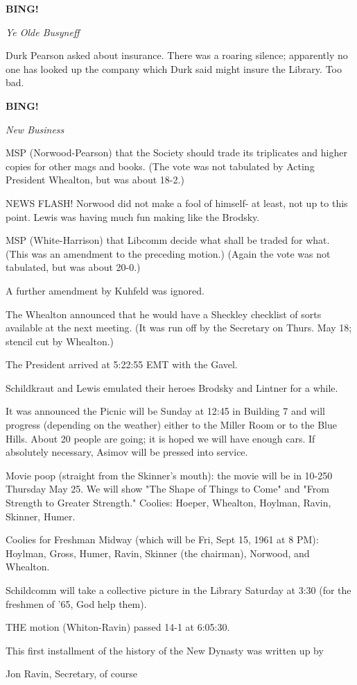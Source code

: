 \documentclass[12pt]{article}
\newcommand{\bing}{{\bf BING!} }
\newcommand{\goto}[1]{\bing \vskip 12pt \centerline{{\em{#1}}}}
\begin{document}
\goto{Ye Olde Busyneff}

Durk Pearson asked about insurance. There was a roaring silence; apparently no one has looked up the company which Durk said might insure the Library. Too bad.

\goto{New Business}

MSP (Norwood-Pearson) that the Society should trade its triplicates and higher copies for other mags and books. (The vote was not tabulated by Acting President Whealton, but was about 18-2.)

NEWS FLASH! Norwood did not make a fool of himself- at least, not up to this point. Lewis was having much fun making like the Brodsky.

MSP (White-Harrison) that Libcomm decide what shall be traded for what. (This was an amendment to the preceding motion.) (Again the vote was not tabulated, but was about 20-0.)

A further amendment by Kuhfeld was ignored.

The Whealton announced that he would have a Sheckley checklist of sorts available at the next meeting. (It was run off by the Secretary on Thurs. May 18; stencil cut by Whealton.)

The President arrived at 5:22:55 EMT with the Gavel.

Schildkraut and Lewis emulated their heroes Brodsky and Lintner for a while.

It was announced the Picnic will be Sunday at 12:45 in Building 7 and will progress (depending on the weather) either to the Miller Room or to the Blue Hills. About 20 people are going; it is hoped we will have enough cars. If absolutely necessary, Asimov will be pressed into service.

Movie poop (straight from the Skinner's mouth): the movie will be in 10-250 Thursday May 25. We will show "The Shape of Things to Come" and "From Strength to Greater Strength." Coolies: Hoeper, Whealton, Hoylman, Ravin, Skinner, Humer.

Coolies for Freshman Midway (which will be Fri, Sept 15, 1961 at 8 PM): Hoylman, Gross, Humer, Ravin, Skinner (the chairman), Norwood, and Whealton.

Schildcomm will take a collective picture in the Library Saturday at 3:30 (for the freshmen of '65, God help them).

THE motion (Whiton-Ravin) passed 14-1 at 6:05:30.

\vspace{12pt}

\centerline{This first installment of the history of the New Dynasty was written up by}
\centerline{Jon Ravin, Secretary, of course}
\end{document}
